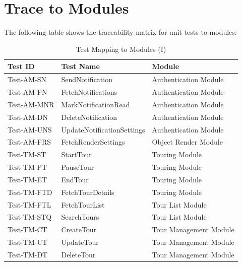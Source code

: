 \documentclass[12pt, titlepage]{article}
\begin{document}
\section{Trace to Modules}

The following table shows the traceability matrix for unit tests to modules:

\begin{table}[htpb!]
  \centering
  \begin{tabular}{|l|p{6cm}|p{4cm}|}
    \hline
    \textbf{Test ID} & \textbf{Test Name}         & \textbf{Module}        \\
    \hline
    Test-AM-SN       & SendNotification           & Authentication Module  \\
    \hline
    Test-AM-FN       & FetchNotifications         & Authentication Module  \\
    \hline
    Test-AM-MNR      & MarkNotificationRead       & Authentication Module  \\
    \hline
    Test-AM-DN       & DeleteNotification         & Authentication Module  \\
    \hline
    Test-AM-UNS      & UpdateNotificationSettings & Authentication Module  \\
    \hline
    Test-AM-FRS      & FetchRenderSettings        & Object Render Module   \\
    \hline
    Test-TM-ST       & StartTour                  & Touring Module         \\
    \hline
    Test-TM-PT       & PauseTour                  & Touring Module         \\
    \hline
    Test-TM-ET       & EndTour                    & Touring Module         \\
    \hline
    Test-TM-FTD      & FetchTourDetails           & Touring Module         \\
    \hline
    Test-TM-FTL      & FetchTourList              & Tour List Module       \\
    \hline
    Test-TM-STQ      & SearchTours                & Tour List Module       \\
    \hline
    Test-TM-CT       & CreateTour                 & Tour Management Module \\
    \hline
    Test-TM-UT       & UpdateTour                 & Tour Management Module \\
    \hline
    Test-TM-DT       & DeleteTour                 & Tour Management Module \\
    \hline
  \end{tabular}
  \caption{Test Mapping to Modules (I)}
  \label{tab:test_mapping1}
\end{table}
\end{document}
